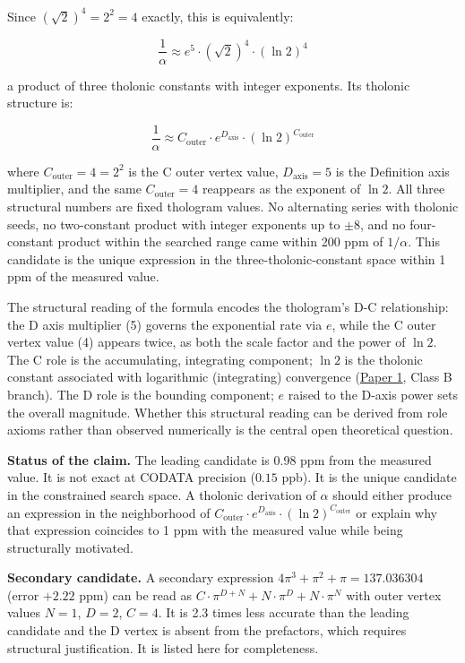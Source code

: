 \documentclass[12pt]{article}
\begin{document}
Since \((\sqrt{2})^4 = 2^2 = 4\) exactly, this is equivalently:

\[\frac{1}{\alpha} \approx e^5 \cdot (\sqrt{2})^4 \cdot (\ln 2)^4\]

a product of three tholonic constants with integer exponents. Its
tholonic structure is:

\[\frac{1}{\alpha} \approx C_{\text{outer}} \cdot e^{D_{\text{axis}}} \cdot (\ln 2)^{C_{\text{outer}}}\]

where \(C_{\text{outer}} = 4 = 2^2\) is the C outer vertex value,
\(D_{\text{axis}} = 5\) is the Definition axis multiplier, and the same
\(C_{\text{outer}} = 4\) reappears as the exponent of \(\ln 2\). All
three structural numbers are fixed thologram values. No alternating
series with tholonic seeds, no two-constant product with integer
exponents up to \(\pm 8\), and no four-constant product within the
searched range came within 200 ppm of \(1/\alpha\). This candidate is
the unique expression in the three-tholonic-constant space within 1 ppm
of the measured value.

The structural reading of the formula encodes the thologram's D-C
relationship: the D axis multiplier (5) governs the exponential rate via
\(e\), while the C outer vertex value (4) appears twice, as both the
scale factor and the power of \(\ln 2\). The C role is the accumulating,
integrating component; \(\ln 2\) is the tholonic constant associated
with logarithmic (integrating) convergence
(\href{https://github.com/baardev/truevalue/blob/main/docnav/Research/papers/1_recursive-tholonic-five-constants/1_recursive-tholonic-five-constants.pdf}{Paper
1}, Class B branch). The D role is the bounding component; \(e\) raised
to the D-axis power sets the overall magnitude. Whether this structural
reading can be derived from role axioms rather than observed numerically
is the central open theoretical question.

\textbf{Status of the claim.} The leading candidate is 0.98 ppm from the
measured value. It is not exact at CODATA precision (\(0.15\) ppb). It
is the unique candidate in the constrained search space. A tholonic
derivation of \(\alpha\) should either produce an expression in the
neighborhood of
\(C_{\text{outer}} \cdot e^{D_{\text{axis}}} \cdot (\ln 2)^{C_{\text{outer}}}\)
or explain why that expression coincides to 1 ppm with the measured
value while being structurally motivated.

\textbf{Secondary candidate.} A secondary expression
\(4\pi^3 + \pi^2 + \pi = 137.036304\) (error \(+2.22\) ppm) can be read
as \(C \cdot \pi^{D+N} + N \cdot \pi^D + N \cdot \pi^N\) with outer
vertex values \(N = 1\), \(D = 2\), \(C = 4\). It is 2.3 times less
accurate than the leading candidate and the D vertex is absent from the
prefactors, which requires structural justification. It is listed here
for completeness.
\end{document}
